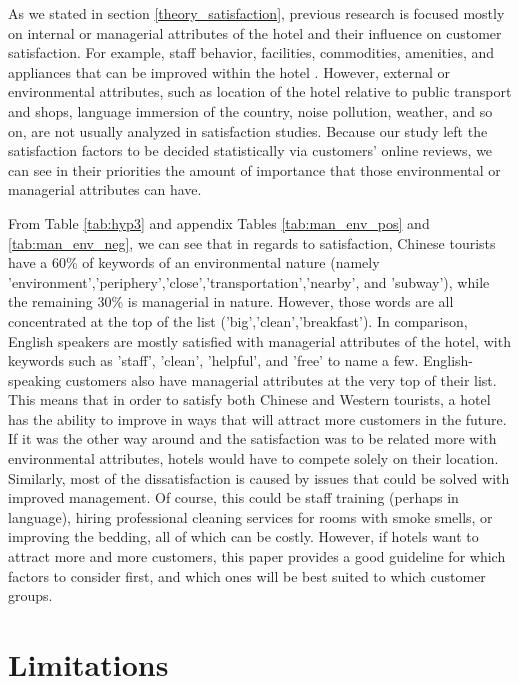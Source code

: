 As we stated in section \ref{theory_satisfaction}, previous research is focused mostly on internal or managerial attributes of the hotel and their influence on customer satisfaction. For example, staff behavior, facilities, commodities, amenities, and appliances that can be improved within the hotel \cite[e.g.][]{shanka2004, choi2001}. However, external or environmental attributes, such as location of the hotel relative to public transport and shops, language immersion of the country, noise pollution, weather, and so on, are not usually analyzed in satisfaction studies. Because our study left the satisfaction factors to be decided statistically via customers' online reviews, we can see in their priorities the amount of importance that those environmental or managerial attributes can have. 

From Table \ref{tab:hyp3} and appendix Tables \ref{tab:man_env_pos} and \ref{tab:man_env_neg}, we can see that in regards to satisfaction, Chinese tourists have a 60\% of keywords of an environmental nature (namely 'environment','periphery','close','transportation','nearby', and 'subway'), while the remaining 30\% is managerial in nature. However, those words are all concentrated at the top of the list ('big','clean','breakfast'). In comparison, English speakers are mostly satisfied with managerial attributes of the hotel, with keywords such as 'staff', 'clean', 'helpful', and 'free' to name a few. English-speaking customers also have managerial attributes at the very top of their list. This means that in order to satisfy both Chinese and Western tourists, a hotel has the ability to improve in ways that will attract more customers in the future. If it was the other way around and the satisfaction was to be related more with environmental attributes, hotels would have to compete solely on their location. Similarly, most of the dissatisfaction is caused by issues that could be solved with improved management. Of course, this could be staff training (perhaps in language), hiring professional cleaning services for rooms with smoke smells, or improving the bedding, all of which can be costly. However, if hotels want to attract more and more customers, this paper provides a good guideline for which factors to consider first, and which ones will be best suited to which customer groups.

\section{Limitations}\label{limitations}

